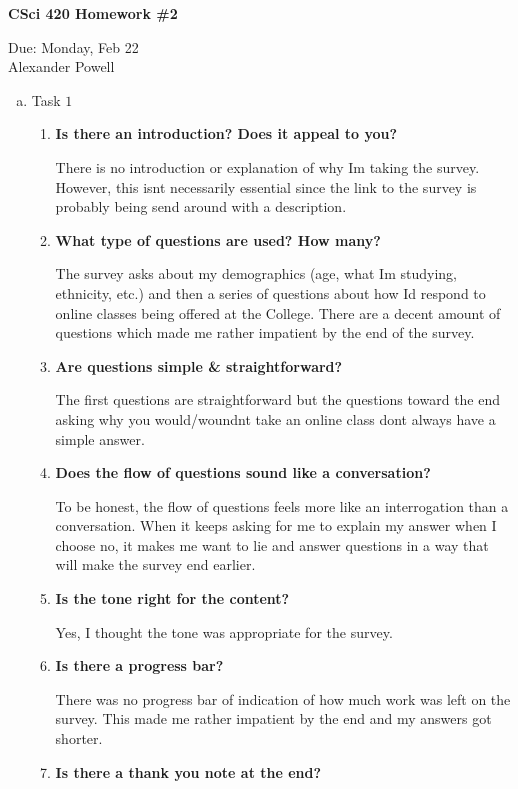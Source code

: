 \documentclass[11pt]{article}
\begin{document}
\begin{center}             %
\begin{LARGE}
{\bf CSci 420 Homework \#2}
\end{LARGE}
\vskip 0.25cm      %

Due: Monday, Feb 22\\  %
Alexander Powell
\end{center}

\begin{enumerate}[a)]
\item Task $1$
\begin{enumerate}[1)]
\item \textbf{Is there an introduction? Does it appeal to you?}

There is no introduction or explanation of why I\textquotesingle m taking the survey.  However, this isn\textquotesingle t necessarily essential since the link to the survey is probably being send around with a description.  
\item \textbf{What type of questions are used? How many?}

The survey asks about my demographics (age, what I\textquotesingle m studying, ethnicity, etc.) and then a series of questions about how I\textquotesingle d respond to online classes being offered at the College.  There are a decent amount of questions which made me rather impatient by the end of the survey.  
\item \textbf{Are questions simple \& straightforward?}

The first questions are straightforward but the questions toward the end asking why you would/woundn\textquotesingle t take an online class don\textquotesingle t always have a simple answer.  
\item \textbf{Does the flow of questions sound like a conversation?}

To be honest, the flow of questions feels more like an interrogation than a conversation.  When it keeps asking for me to explain my answer when I choose no, it makes me want to lie and answer questions in a way that will make the survey end earlier.  
\item \textbf{Is the tone right for the content?}

Yes, I thought the tone was appropriate for the survey.  
\item \textbf{Is there a progress bar?}

There was no progress bar of indication of how much work was left on the survey.  This made me rather impatient by the end and my answers got shorter.  
\item \textbf{Is there a thank you note at the end?}


\end{enumerate}
\end{enumerate}
\end{document}
